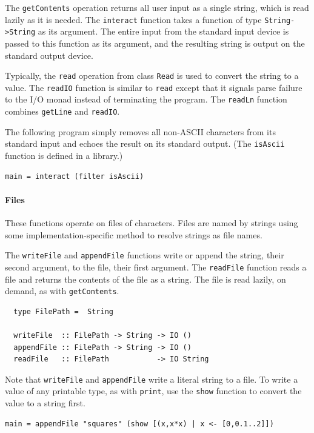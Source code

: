 The \mbox{\tt getContents} operation returns all user input as a single
string, which is read lazily as it is needed.  The \mbox{\tt interact}
function takes a function of type 
\mbox{\tt String->String} as its argument.  The entire input from the standard
input device is passed to this function
as its argument, and the resulting string is output on the
standard output device.

Typically, the \mbox{\tt read} operation from class \mbox{\tt Read} is used
to convert the string to a value.  The \mbox{\tt readIO} function is similar to \mbox{\tt read}
except that it signals parse failure to the I/O monad instead of
terminating the program.  The \mbox{\tt readLn} function combines \mbox{\tt getLine} and
\mbox{\tt readIO}.



The following program simply removes all non-ASCII characters from its
standard input and echoes the result on its standard output.  (The
\mbox{\tt isAscii} function is defined in a library.)
\bprog
{\small\begin{verbatim}
main = interact (filter isAscii)
\end{verbatim}}
\eprog
\paragraph*{Files}
These functions operate on files of characters.  Files are named by
strings using some implementation-specific method to resolve strings as
file names.

The \mbox{\tt writeFile} and \mbox{\tt appendFile} functions write or append the string,
their second argument, to the file, their first argument.
The \mbox{\tt readFile} function reads a file and
returns the contents of the file as a string.  The file is read
lazily, on demand, as with \mbox{\tt getContents}.
\bprog
{\small\begin{verbatim}
  type FilePath =  String
  
  writeFile  :: FilePath -> String -> IO ()
  appendFile :: FilePath -> String -> IO ()
  readFile   :: FilePath           -> IO String
\end{verbatim}}
\eprog
{}%
%
%
%
Note that \mbox{\tt writeFile} and \mbox{\tt appendFile} write a literal string
to a file.  To write a value of any printable type, as with \mbox{\tt print}, use the
\mbox{\tt show} function to convert the value to a string first.
\bprog
{\small\begin{verbatim}
main = appendFile "squares" (show [(x,x*x) | x <- [0,0.1..2]])
\end{verbatim}}
\eprog

